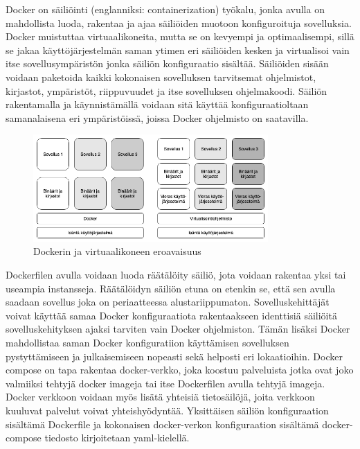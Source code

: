     Docker on säiliöinti (englanniksi: containerization) työkalu, jonka avulla on mahdollista luoda, rakentaa ja ajaa säiliöiden muotoon konfiguroituja sovelluksia.
    Docker muistuttaa virtuaalikoneita, mutta se on kevyempi ja optimaalisempi, sillä se jakaa käyttöjärjestelmän saman ytimen eri säiliöiden kesken ja virtualisoi vain itse sovellusympäristön jonka säiliön konfiguraatio sisältää.
    Säiliöiden sisään voidaan paketoida kaikki kokonaisen sovelluksen tarvitsemat ohjelmistot, kirjastot, ympäristöt, riippuvuudet ja itse sovelluksen ohjelmakoodi.
    Säiliön rakentamalla ja käynnistämällä voidaan sitä käyttää konfiguraatioltaan samanalaisena eri ympäristöissä, joissa Docker ohjelmisto on saatavilla.

    \begin{figure}[H]
      \centering
      \includegraphics[width=0.8\textwidth]{assets/docker-vs-virtual-machine.png}
      \caption{Dockerin ja virtuaalikoneen eroavaisuus}
      \label{fig:docker-vs-virtual-machine}
    \end{figure}

    Dockerfilen avulla voidaan luoda räätälöity säiliö, jota voidaan rakentaa yksi tai useampia instansseja.
    Räätälöidyn säiliön etuna on etenkin se, että sen avulla saadaan sovellus joka on periaatteessa alustariippumaton.
    Sovelluskehittäjät voivat käyttää samaa Docker konfiguraatiota rakentaakseen identtisiä säiliöitä sovelluskehityksen ajaksi tarviten vain Docker ohjelmiston.
    Tämän lisäksi Docker mahdollistaa saman Docker konfiguratiion käyttämisen sovelluksen pystyttämiseen ja julkaisemiseen nopeasti sekä helposti eri lokaatioihin.
    Docker compose on tapa rakentaa docker-verkko, joka koostuu palveluista jotka ovat joko valmiiksi tehtyjä docker imageja tai itse Dockerfilen avulla tehtyjä imageja.
    Docker verkkoon voidaan myös lisätä yhteisiä tietosäilöjä, joita verkkoon kuuluvat palvelut voivat yhteishyödyntää.
    Yksittäisen säiliön konfiguraation sisältämä Dockerfile ja kokonaisen docker-verkon konfiguraation sisältämä docker-compose tiedosto kirjoitetaan yaml-kielellä.

